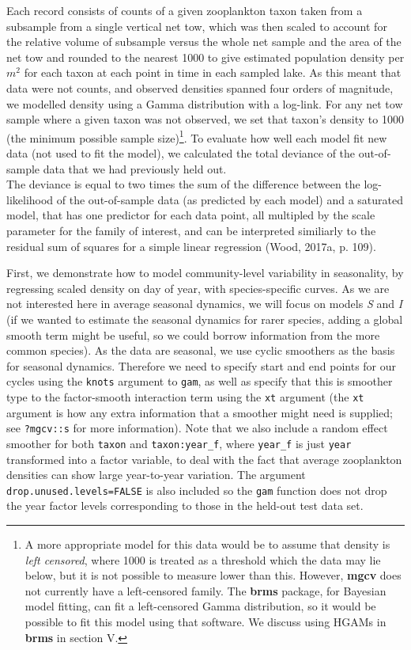\documentclass[12pt]{article}
\let\rmarkdownfootnote\footnote%
\def\footnote{\protect\rmarkdownfootnote}
\begin{document}
Each record consists of counts of a given zooplankton taxon taken from a
subsample from a single vertical net tow, which was then scaled to
account for the relative volume of subsample versus the whole net sample
and the area of the net tow and rounded to the nearest 1000 to give
estimated population density per \(m^2\) for each taxon at each point in
time in each sampled lake. As this meant that data were not counts, and
observed densities spanned four orders of magnitude, we modelled density
using a Gamma distribution with a log-link. For any net tow sample where
a given taxon was not observed, we set that taxon's density to 1000 (the
minimum possible sample size)\footnote{A more appropriate model for this
  data would be to assume that density is \emph{left censored}, where
  1000 is treated as a threshold which the data may lie below, but it is
  not possible to measure lower than this. However, \textbf{mgcv} does
  not currently have a left-censored family. The \textbf{brms} package,
  for Bayesian model fitting, can fit a left-censored Gamma
  distribution, so it would be possible to fit this model using that
  software. We discuss using HGAMs in \textbf{brms} in section V.}. To
evaluate how well each model fit new data (not used to fit the model),
we calculated the total deviance of the out-of-sample data that we had
previously held out.\\
The deviance is equal to two times the sum of the difference between the
log-likelihood of the out-of-sample data (as predicted by each model)
and a saturated model, that has one predictor for each data point, all
multipled by the scale parameter for the family of interest, and can be
interpreted similiarly to the residual sum of squares for a simple
linear regression (Wood, 2017a, p. 109).

First, we demonstrate how to model community-level variability in
seasonality, by regressing scaled density on day of year, with
species-specific curves. As we are not interested here in average
seasonal dynamics, we will focus on models \emph{S} and \emph{I} (if we
wanted to estimate the seasonal dynamics for rarer species, adding a
global smooth term might be useful, so we could borrow information from
the more common species). As the data are seasonal, we use cyclic
smoothers as the basis for seasonal dynamics. Therefore we need to
specify start and end points for our cycles using the \texttt{knots}
argument to \texttt{gam}, as well as specify that this is smoother type
to the factor-smooth interaction term using the \texttt{xt} argument
(the \texttt{xt} argument is how any extra information that a smoother
might need is supplied; see \texttt{?mgcv::s} for more information).
Note that we also include a random effect smoother for both
\texttt{taxon} and \texttt{taxon:year\_f}, where \texttt{year\_f} is
just \texttt{year} transformed into a factor variable, to deal with the
fact that average zooplankton densities can show large year-to-year
variation. The argument \texttt{drop.unused.levels=FALSE} is also
included so the \texttt{gam} function does not drop the year factor
levels corresponding to those in the held-out test data set.
\end{document}
